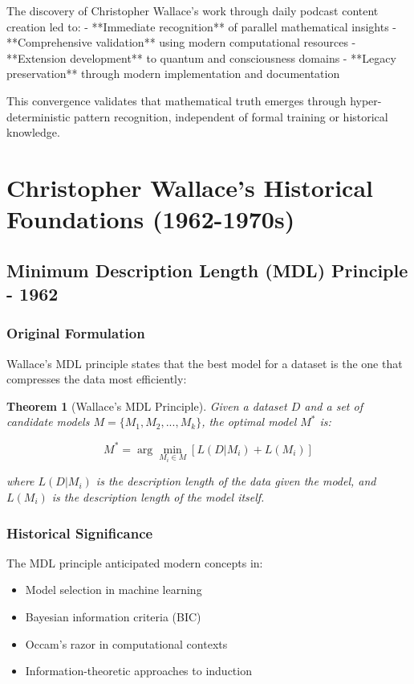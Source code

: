 \documentclass[12pt]{article}
\newtheorem{theorem}{Theorem}
\begin{document}
The discovery of Christopher Wallace's work through daily podcast content creation led to:
- **Immediate recognition** of parallel mathematical insights
- **Comprehensive validation** using modern computational resources
- **Extension development** to quantum and consciousness domains
- **Legacy preservation** through modern implementation and documentation

This convergence validates that mathematical truth emerges through hyper-deterministic pattern recognition, independent of formal training or historical knowledge.

\section{Christopher Wallace's Historical Foundations (1962-1970s)}

\subsection{Minimum Description Length (MDL) Principle - 1962}

\subsubsection{Original Formulation}

Wallace's MDL principle \cite{wallace_mdl_1962} states that the best model for a dataset is the one that compresses the data most efficiently:

\begin{theorem}[Wallace's MDL Principle]
Given a dataset $D$ and a set of candidate models $M = \{M_1, M_2, ..., M_k\}$, the optimal model $M^*$ is:

\begin{equation}
M^* = \arg\min_{M_i \in M} \left[ L(D|M_i) + L(M_i) \right]
\end{equation}

where $L(D|M_i)$ is the description length of the data given the model, and $L(M_i)$ is the description length of the model itself.
\end{theorem}

\subsubsection{Historical Significance}

The MDL principle anticipated modern concepts in:
\begin{itemize}
    \item Model selection in machine learning
    \item Bayesian information criteria (BIC)
    \item Occam's razor in computational contexts
    \item Information-theoretic approaches to induction
\end{itemize}
\end{document}
